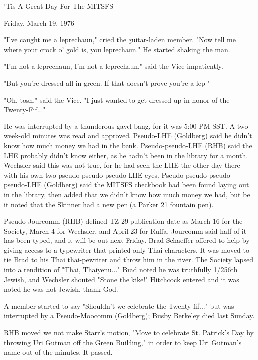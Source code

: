 \documentclass[12pt]{article}
\begin{document}
\begin{center}

'Tis A Great Day For The MITSFS

Friday, March 19, 1976

\end{center}
 
\vspace{12pt}

\setlength{\parskip}{6pt}

\noindent
"I've caught me a leprechaun," cried the guitar-laden member. "Now tell me where your crock o' gold is, you leprechaun." He started shaking the man.

"I'm not a leprechaun, I'm not a leprechaun," said the Vice impatiently.

"But you're dressed all in green. If that doesn't prove you're a lep-"

"Oh, tosh," said the Vice. "I just wanted to get dressed up in honor of the Twenty-Fif..."

He was interrupted by a thunderous gavel bang, for it was 5:00 PM SST. A two-week-old minutes was read and approved. Pseudo-LHE (Goldberg) said he didn't know how much money we had in the bank. Pseudo-pseudo-LHE (RHB) said the LHE probably didn't know either, as he hadn't been in the library for a month. Wechsler said this was not true, for he had seen the LHE the other day there with his own two pseudo-pseudo-pseudo-LHE eyes. Pseudo-pseudo-pseudo-pseudo-LHE (Goldberg) said the MITSFS checkbook had been found laying out in the library, then added that we didn't know how much money we had, but be it noted that the Skinner had a new pen (a Parker 21 fountain pen).

Pseudo-Jourcomm (RHB) defined TZ 29 publication date as March 16 for the Society, March 4 for Wechsler, and April 23 for Ruffa. Jourcomm said half of it has been typed, and it will be out next Friday. Brad Schaeffer offered to help by giving access to a typewriter that printed only Thai characters. It was moved to tie Brad to his Thai thai-pewriter and throw him in the river. The Society lapsed into a rendition of "Thai, Thaiyenu..." Brad noted he was truthfully 1/256th Jewish, and Wechsler shouted "Stone the kike!" Hitchcock entered and it was noted he was not Jewish, thank God.

A member started to say "Shouldn't we celebrate the Twenty-fif..." but was interrupted by a Pseudo-Moocomm (Goldberg); Busby Berkeley died last Sunday.

RHB moved we not make Starr's motion, "Move to celebrate St. Patrick's Day by throwing Uri Gutman off the Green Building," in order to keep Uri Gutman's name out of the minutes. It passed.
\end{document}
